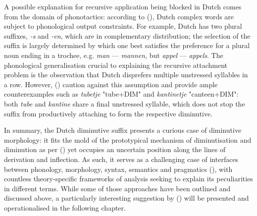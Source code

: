 A possible explanation for recursive application being blocked in Dutch comes from the domain of phonotactics: according to \citeauthor{Booij+1998} (\citeyear{Booij+1998}), Dutch complex words are subject to phonological output constraints. For example, Dutch has two plural suffixes, \textit{-s} and \textit{-en}, which are in complementary distribution; the selection of the suffix is largely determined by which one best satisfies the preference for a plural noun ending in a trochee, e.g. \textit{man} --- \textit{mannen}, but \textit{appel} --- \textit{appels}. The phonological generalisation crucial to explaining the recursive attachment problem is the observation that Dutch disprefers multiple unstressed syllables in a row. However, \citeauthor{taalportaal} (\citeyear{taalportaal}) caution against this assumption and provide ample counterexamples such as \textit{tubetje} "tube+DIM" and \textit{kantinetje} "canteen+DIM": both \textit{tube} and \textit{kantine} share a final unstressed syllable, which does not stop the suffix from productively attaching to form the respective diminutive.

In summary, the Dutch diminutive suffix presents a curious case of diminutive morphology: it fits the mold of the prototypical mechanism of diminutisation and diminution as per \citeauthor{Schneider+2003} (\citeyear{Schneider+2003}) yet occupies an uncertain position along the lines of derivation and inflection. As such, it serves as a challenging case of interfaces between phonology, morphology, syntax, semantics and pragmatics (\cite{DeBelder+2022}), with countless theory-specific frameworks of analysis seeking to explain its peculiarities in different terms. While some of those approaches have been outlined and discussed above, a particularly interesting suggestion by \citeauthor{DeBelder+etal+2014} (\citeyear{DeBelder+etal+2014}) will be presented and operationalised in the following chapter.